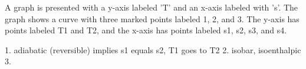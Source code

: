 A graph is presented with a y-axis labeled 'T' and an x-axis labeled with 's'. The graph shows a curve with three marked points labeled 1, 2, and 3. The y-axis has points labeled T1 and T2, and the x-axis has points labeled s1, s2, s3, and s4. 

1. adiabatic (reversible) implies s1 equals s2, T1 goes to T2
2. isobar, isoenthalpic
3.